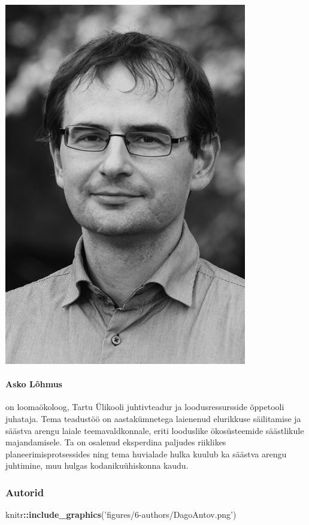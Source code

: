 \documentclass[estonian,]{article}
\newenvironment{Shaded}{\begin{snugshade}}{\end{snugshade}}
\newcommand{\KeywordTok}[1]{\textcolor[rgb]{0.13,0.29,0.53}{\textbf{#1}}}
\newcommand{\NormalTok}[1]{#1}
\newcommand{\OperatorTok}[1]{\textcolor[rgb]{0.81,0.36,0.00}{\textbf{#1}}}
\newcommand{\StringTok}[1]{\textcolor[rgb]{0.31,0.60,0.02}{#1}}
\let\oldparagraph\paragraph
\renewcommand{\paragraph}[1]{\oldparagraph{#1}\mbox{}}
\begin{document}
\begin{flushleft}\includegraphics[width=0.5\linewidth]{figures/6-authors/AskoLohmus} \end{flushleft}

\hypertarget{asko-luxf5hmus}{%
\paragraph{Asko Lõhmus}\label{asko-luxf5hmus}}

on loomaökoloog, Tartu Ülikooli juhtivteadur ja loodusressursside õppetooli juhataja. Tema teadustöö on aastakümnetega laienenud elurikkuse säilitamise ja säästva arengu laiale teemavaldkonnale, eriti looduslike ökosüsteemide säästlikule majandamisele. Ta on osalenud eksperdina paljudes riiklikes planeerimisprotsessides ning tema huvialade hulka kuulub ka säästva arengu juhtimine, muu hulgas kodanikuühiskonna kaudu.

\hypertarget{autorid}{%
\subsubsection*{Autorid}\label{autorid}}

\begin{Shaded}
\begin{Highlighting}[]
\NormalTok{knitr}\OperatorTok{::}\KeywordTok{include_graphics}\NormalTok{(}\StringTok{'figures/6-authors/DagoAntov.png'}\NormalTok{)}
\end{Highlighting}
\end{Shaded}
\end{document}
